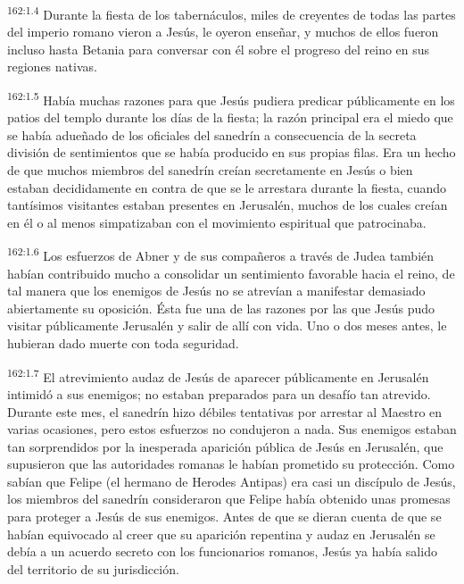 \par 
\textsuperscript{162:1.4} Durante la fiesta de los tabernáculos, miles de creyentes de todas las partes del imperio romano vieron a Jesús, le oyeron enseñar, y muchos de ellos fueron incluso hasta Betania para conversar con él sobre el progreso del reino en sus regiones nativas.

\par 
\textsuperscript{162:1.5} Había muchas razones para que Jesús pudiera predicar públicamente en los patios del templo durante los días de la fiesta; la razón principal era el miedo que se había adueñado de los oficiales del sanedrín a consecuencia de la secreta división de sentimientos que se había producido en sus propias filas. Era un hecho de que muchos miembros del sanedrín creían secretamente en Jesús o bien estaban decididamente en contra de que se le arrestara durante la fiesta, cuando tantísimos visitantes estaban presentes en Jerusalén, muchos de los cuales creían en él o al menos simpatizaban con el movimiento espiritual que patrocinaba.

\par 
\textsuperscript{162:1.6} Los esfuerzos de Abner y de sus compañeros a través de Judea también habían contribuido mucho a consolidar un sentimiento favorable hacia el reino, de tal manera que los enemigos de Jesús no se atrevían a manifestar demasiado abiertamente su oposición. Ésta fue una de las razones por las que Jesús pudo visitar públicamente Jerusalén y salir de allí con vida. Uno o dos meses antes, le hubieran dado muerte con toda seguridad.

\par 
\textsuperscript{162:1.7} El atrevimiento audaz de Jesús de aparecer públicamente en Jerusalén intimidó a sus enemigos; no estaban preparados para un desafío tan atrevido. Durante este mes, el sanedrín hizo débiles tentativas por arrestar al Maestro en varias ocasiones, pero estos esfuerzos no condujeron a nada. Sus enemigos estaban tan sorprendidos por la inesperada aparición pública de Jesús en Jerusalén, que supusieron que las autoridades romanas le habían prometido su protección. Como sabían que Felipe (el hermano de Herodes Antipas) era casi un discípulo de Jesús, los miembros del sanedrín consideraron que Felipe había obtenido unas promesas para proteger a Jesús de sus enemigos. Antes de que se dieran cuenta de que se habían equivocado al creer que su aparición repentina y audaz en Jerusalén se debía a un acuerdo secreto con los funcionarios romanos, Jesús ya había salido del territorio de su jurisdicción.

